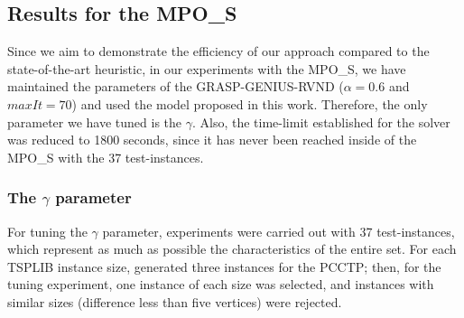 \documentclass{singlecol-new}
\theoremstyle{TH}{
\newtheorem{lemma}{Lemma}
\newtheorem{theorem}[lemma]{Theorem}
\newtheorem{corrolary}[lemma]{Corrolary}
\newtheorem{conjecture}[lemma]{Conjecture}
\newtheorem{proposition}[lemma]{Proposition}
\newtheorem{claim}[lemma]{Claim}
\newtheorem{stheorem}[lemma]{Wrong Theorem}
}
\theoremstyle{THrm}{
\newtheorem{definition}{Definition}[section]
\newtheorem{question}{Question}[section]
\newtheorem{remark}{Remark}
\newtheorem{scheme}{Scheme}
}
\theoremstyle{THhit}{
\newtheorem{case}{Case}[section]
}
\begin{document}
\subsection{Results for the MPO\_S}
\label{sec:mpo}


Since we aim to demonstrate the efficiency of our approach compared to the state-of-the-art heuristic, in our experiments with the MPO\_S, we have maintained the parameters of the GRASP-GENIUS-RVND ($\alpha = 0.6$ and $maxIt = 70 $) and used the model proposed in this work. Therefore, the only parameter we have tuned is the $\gamma$. Also, the time-limit established for the solver was reduced to 1800 seconds, since it has never been reached inside of the MPO\_S with the 37 test-instances.


\subsubsection{The $\gamma$ parameter}

For tuning the $\gamma$ parameter, experiments were carried out with 37 test-instances, which represent as much as possible the characteristics of the entire set. For each TSPLIB \citep{reinelt1991tsplib} instance size, \citet{silva2009problema} generated three instances for the PCCTP; then, for the tuning experiment, one instance of each size was selected, and instances with similar sizes (difference less than five vertices) were rejected.
\end{document}
